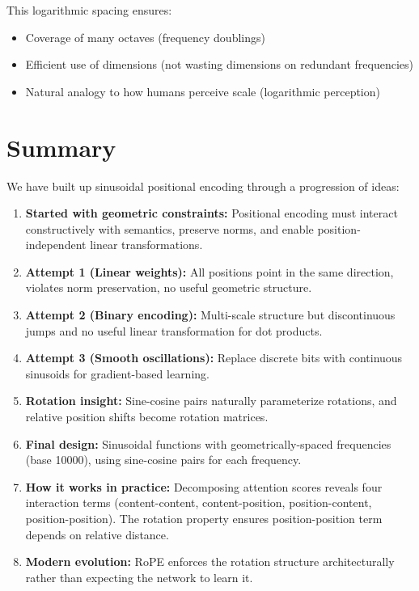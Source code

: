 \documentclass{article}
\begin{document}
This logarithmic spacing ensures:
\begin{itemize}
\item Coverage of many octaves (frequency doublings)
\item Efficient use of dimensions (not wasting dimensions on redundant frequencies)
\item Natural analogy to how humans perceive scale (logarithmic perception)
\end{itemize}

\section{Summary}

We have built up sinusoidal positional encoding through a progression of ideas:

\begin{enumerate}
\item \textbf{Started with geometric constraints:} Positional encoding must interact constructively with semantics, preserve norms, and enable position-independent linear transformations.

\item \textbf{Attempt 1 (Linear weights):} All positions point in the same direction, violates norm preservation, no useful geometric structure.

\item \textbf{Attempt 2 (Binary encoding):} Multi-scale structure but discontinuous jumps and no useful linear transformation for dot products.

\item \textbf{Attempt 3 (Smooth oscillations):} Replace discrete bits with continuous sinusoids for gradient-based learning.

\item \textbf{Rotation insight:} Sine-cosine pairs naturally parameterize rotations, and relative position shifts become rotation matrices.

\item \textbf{Final design:} Sinusoidal functions with geometrically-spaced frequencies (base 10000), using sine-cosine pairs for each frequency.

\item \textbf{How it works in practice:} Decomposing attention scores reveals four interaction terms (content-content, content-position, position-content, position-position). The rotation property ensures position-position term depends on relative distance.

\item \textbf{Modern evolution:} RoPE enforces the rotation structure architecturally rather than expecting the network to learn it.
\end{enumerate}
\end{document}
